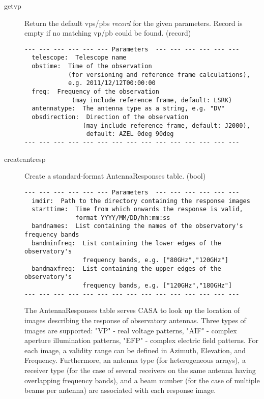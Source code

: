 \documentclass[12pt]{article}
\begin{document}
\begin{description}
  \item[getvp]
   Return the default vps/pbs {\it record} for the given parameters.
   Record is empty if no matching vp/pb could be found. (record)

{\small
\begin{verbatim}
--- --- --- --- --- --- Parameters  --- --- --- --- --- ---
  telescope:  Telescope name 
  obstime:  Time of the observation 
            (for versioning and reference frame calculations), 
            e.g. 2011/12/12T00:00:00 
  freq:  Frequency of the observation 
             (may include reference frame, default: LSRK) 
  antennatype:  The antenna type as a string, e.g. "DV" 
  obsdirection:  Direction of the observation 
                (may include reference frame, default: J2000), 
                 default: AZEL 0deg 90deg 
--- --- --- --- --- --- --- --- --- --- --- --- --- --- ---
\end{verbatim} 
} 

  \item[createantresp]
   Create a standard-format AntennaResponses table. (bool)

{\small
\begin{verbatim}
--- --- --- --- --- --- Parameters  --- --- --- --- --- ---
  imdir:  Path to the directory containing the response images 
  starttime:  Time from which onwards the response is valid, 
              format YYYY/MM/DD/hh:mm:ss 
  bandnames:  List containing the names of the observatory's frequency bands 
  bandminfreq:  List containing the lower edges of the observatory's 
                frequency bands, e.g. ["80GHz","120GHz"] 
  bandmaxfreq:  List containing the upper edges of the observatory's 
                frequency bands, e.g. ["120GHz","180GHz"] 
--- --- --- --- --- --- --- --- --- --- --- --- --- --- ---
\end{verbatim} 
} 

   
The AntennaResponses table serves CASA to look up the location of images describing the
response of observatory antennas. Three types of images are supported: "VP" - real voltage patterns,
"AIF" - complex aperture illumination patterns, "EFP" - complex electric field patterns.
For each image, a validity range can be defined in Azimuth, Elevation, and Frequency.
Furthermore, an antenna type (for heterogeneous arrays), a receiver type (for the case of
several receivers on the same antenna having overlapping frequency bands), and a beam number
(for the case of multiple beams per antenna) are associated with each response image.


\end{description}
\end{document}
